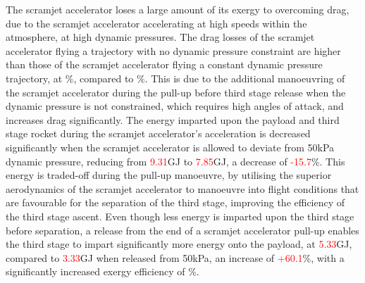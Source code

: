  
 The scramjet accelerator loses a large amount of its exergy to overcoming drag, due to the scramjet accelerator accelerating at high speeds within the atmosphere, at high dynamic pressures. 
 The drag losses of the scramjet accelerator flying a trajectory with no dynamic pressure constraint are higher than those of the scramjet accelerator flying a constant dynamic pressure trajectory, at \WDsecondStandardNoReturn\%, compared to \WDsecondConstqNoReturn\%. This is due to the additional manoeuvring of the scramjet accelerator during the pull-up before third stage release when the dynamic pressure is not constrained, which requires high angles of attack, and increases drag significantly. 
The energy imparted upon the payload and third stage rocket during the scramjet accelerator's acceleration is decreased significantly when the scramjet accelerator is allowed to deviate from 50kPa dynamic pressure, reducing from \textcolor{red}{9.31}GJ to \textcolor{red}{7.85}GJ, a decrease of \textcolor{red}{-15.7}\%. This energy is traded-off during the pull-up manoeuvre, by utilising the superior aerodynamics of the scramjet accelerator to manoeuvre into flight conditions that are favourable for the separation of the third stage, improving the efficiency of the third stage ascent. Even though less energy is imparted upon the third stage before separation, a release from the end of a scramjet accelerator pull-up enables the third stage to impart significantly more energy onto the payload, at \textcolor{red}{5.33}GJ, compared to \textcolor{red}{3.33}GJ when released from 50kPa, an increase of \textcolor{red}{+60.1}\%, with a significantly increased exergy efficiency of \thirddExergyEffStandardNoReturn \%.  

